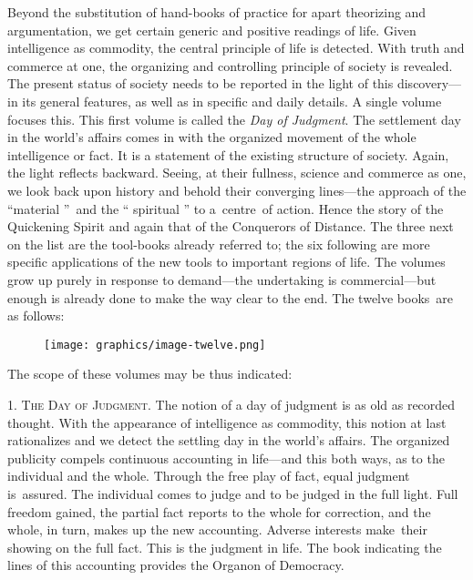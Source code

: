 \documentclass[twoside,symmetric,nobib,justified]{tufte-book}
\begin{document}
Beyond the substitution of hand-books of practice for apart theorizing
and argumentation, we get certain generic and positive readings of life.
Given intelligence as commodity, the central principle of life is
detected. With truth and commerce at one, the organizing and controlling
principle of society is revealed. The present status of society needs to
be reported in the light of this discovery---in its general features, as
well as in specific and daily details. A single volume focuses this.
This first volume is called the \emph{Day of Judgment}. The settlement
day in the world's affairs comes in with the organized movement of the
whole intelligence or fact. It is a statement of the existing structure
of society. Again, the light reflects backward. Seeing, at their
fullness, science and commerce as one, we look back upon history and
behold their converging lines---the approach of the ``material ''~and
the `` spiritual '' to a~centre~of action. Hence the story of the
Quickening Spirit and again that of the Conquerors of Distance. The
three next on the list are the tool-books already referred to; the six
following are more specific applications of the new tools to important
regions of life. The volumes grow up purely in response to demand---the
undertaking is commercial---but enough is already done to make the way
clear to the end. The twelve books~are as follows:~

\begin{figure}
    \setlength{\parindent}{142pt}\texttt{[image: graphics/image-twelve.png]}
   \label{fig:fig12}
\end{figure}

The scope of these volumes may be thus indicated:~

\vspace{.15in}

1. \textsc{The Day of Judgment}. The notion of a day of judgment is as old as
recorded thought. With the appearance of intelligence as commodity, this
notion at last rationalizes and we detect the settling day in the
world's affairs. The organized publicity compels continuous accounting
in life---and this both ways, as to the individual and the whole.
Through the free play of fact, equal judgment is~assured. The individual
comes to judge and to be judged in the full light. Full freedom gained,
the partial fact reports to the whole for correction, and the whole, in
turn, makes up the new accounting. Adverse interests make~their showing
on the full fact. This is the judgment in life. The book indicating the
lines of this accounting provides the Organon of Democracy.~
\end{document}
